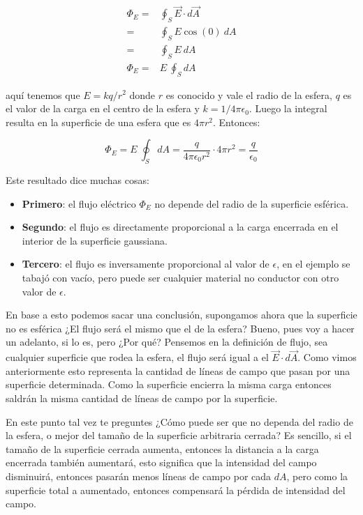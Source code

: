 \begin{align*}
    \Phi_E =& \oint_S \vec{E} \cdot d\vec{A} \\
            =& \oint_S E \cos(0) ~ dA \\
            =& \oint_S E ~ dA \\
    \Phi_E =& E ~ \oint_S dA
\end{align*}

aquí tenemos que \(E=kq/r^2\) donde \(r\) es conocido y vale el radio de la esfera, \(q\) es el valor de la carga en el centro de la esfera y \(k = 1/4\pi\epsilon_0\). Luego la integral resulta en la superficie de una esfera que es \(4\pi r^2\). Entonces:

\[
\Phi_E = E ~ \oint_S dA = \frac{q}{4\pi \epsilon_0 r^2} \cdot 4\pi r^2 = \boxed{\frac{q}{\epsilon_0}} 
\]

Este resultado dice muchas cosas:
\begin{itemize}
    \item \textbf{Primero}: el flujo eléctrico \(\Phi_E\) no depende del radio de la superficie esférica.
    \item \textbf{Segundo}: el flujo es directamente proporcional a la carga encerrada en el interior de la superficie gaussiana.
    \item \textbf{Tercero}: el flujo es inversamente proporcional al valor de \(\epsilon\), en el ejemplo se tabajó con vacío, pero puede ser cualquier material no conductor con otro valor de \(\epsilon\).
\end{itemize}

En base a esto podemos sacar una conclusión, supongamos ahora que la superficie no es esférica ¿El flujo será el mismo que el de la esfera? Bueno, pues voy a hacer un adelanto, si lo es, pero ¿Por qué? Pensemos en la definición de flujo, sea cualquier superficie que rodea la esfera, el flujo será igual a el \(\vec{E}\cdot d\vec{A}\). Como vimos anteriormente esto representa la cantidad de líneas de campo que pasan por una superficie determinada. Como la superficie encierra la misma carga entonces saldrán la misma cantidad de líneas de campo por la superficie.

En este punto tal vez te preguntes ¿Cómo puede ser que no dependa del radio de la esfera, o mejor del tamaño de la superficie arbitraria cerrada? Es sencillo, si el tamaño de la superficie cerrada aumenta, entonces la distancia a la carga encerrada también aumentará, esto significa que la intensidad del campo disminuirá, entonces pasarán menos líneas de campo por cada \(dA\), pero como la superficie total a aumentado, entonces compensará la pérdida de intensidad del campo.

